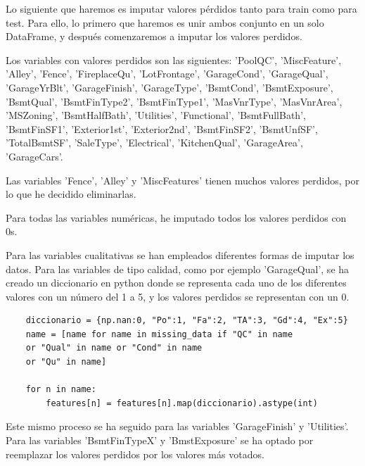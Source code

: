 	\vspace{0.06in}
	
	Lo siguiente que haremos es imputar valores pérdidos tanto para train como para test. Para ello, lo primero que haremos es unir ambos conjunto en un solo DataFrame, y después comenzaremos a imputar los valores perdidos.
	
	\vspace{0.06in}
	
	Los variables con valores perdidos son las siguientes: 'PoolQC',	'MiscFeature',
	'Alley',
	'Fence',
	'FireplaceQu',
	'LotFrontage',
	'GarageCond',
	'GarageQual',
	'GarageYrBlt',
	'GarageFinish',
	'GarageType',
	'BsmtCond',
	'BsmtExposure',
	'BsmtQual',
	'BsmtFinType2',
	'BsmtFinType1',
	'MasVnrType',
	'MasVnrArea',
	'MSZoning',
	'BsmtHalfBath',
	'Utilities',
	'Functional',
	'BsmtFullBath',
	'BsmtFinSF1',
	'Exterior1st',
	'Exterior2nd',
	'BsmtFinSF2',
	'BsmtUnfSF',
	'TotalBsmtSF',
	'SaleType',
	'Electrical',
	'KitchenQual',
	'GarageArea',
	'GarageCars'.
	
	\vspace{0.06in}
	Las variables 'Fence', 'Alley' y 'MiscFeatures' tienen muchos valores perdidos, por lo que he decidido eliminarlas.
	
	\vspace{0.06in}
	Para todas las variables numéricas, he imputado todos los valores perdidos con 0s.	
	
	\vspace{0.06in}
	Para las variables cualitativas se han empleados diferentes formas de imputar los datos. Para las variables de tipo calidad, como por ejemplo 'GarageQual', se ha creado un diccionario en python donde se representa cada uno de los diferentes valores con un número del 1 a 5, y los valores perdidos se representan con un 0.
	
	\vspace{0.06in}
	
	\begin{lstlisting}
	diccionario = {np.nan:0, "Po":1, "Fa":2, "TA":3, "Gd":4, "Ex":5}
	name = [name for name in missing_data if "QC" in name
	or "Qual" in name or "Cond" in name
	or "Qu" in name]
	
	for n in name:
		features[n] = features[n].map(diccionario).astype(int)
	\end{lstlisting}
	
	\vspace{0.06in}
	Este mismo proceso se ha seguido para las variables 'GarageFinish' y  'Utilities'. \\
	Para las variables 'BsmtFinTypeX' y 'BmstExposure' se ha optado por reemplazar los valores perdidos por los valores más votados.
	

